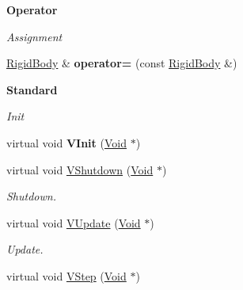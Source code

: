\begin{Indent}{\bf Operator}\par
{\em \label{_amgrpe1b3ec89ead7f83a9245ed5c9cacfdbf}
 Assignment }\begin{DoxyCompactItemize}
\item 
\hypertarget{classContent_1_1Actor_1_1Admin_1_1RigidBody_a066c97c9f287de6a6ba405e5fed4a6dc}{
\hyperlink{classContent_1_1Actor_1_1Admin_1_1RigidBody}{RigidBody} \& {\bfseries operator=} (const \hyperlink{classContent_1_1Actor_1_1Admin_1_1RigidBody}{RigidBody} \&)}
\label{classContent_1_1Actor_1_1Admin_1_1RigidBody_a066c97c9f287de6a6ba405e5fed4a6dc}

\end{DoxyCompactItemize}
\end{Indent}
\begin{Indent}{\bf Standard}\par
{\em \label{_amgrpeb6d8ae6f20283755b339c0dc273988b}
 Init }\begin{DoxyCompactItemize}
\item 
\hypertarget{classContent_1_1Actor_1_1Admin_1_1RigidBody_ad7e5b25f73dded762f6507afb8193a7b}{
virtual void {\bfseries VInit} (\hyperlink{structVoid}{Void} $\ast$)}
\label{classContent_1_1Actor_1_1Admin_1_1RigidBody_ad7e5b25f73dded762f6507afb8193a7b}

\item 
\hypertarget{classContent_1_1Actor_1_1Admin_1_1RigidBody_a7dd39ded6fd6e66612d58546ed5f3be2}{
virtual void \hyperlink{classContent_1_1Actor_1_1Admin_1_1RigidBody_a7dd39ded6fd6e66612d58546ed5f3be2}{VShutdown} (\hyperlink{structVoid}{Void} $\ast$)}
\label{classContent_1_1Actor_1_1Admin_1_1RigidBody_a7dd39ded6fd6e66612d58546ed5f3be2}

\begin{DoxyCompactList}\small\item\em Shutdown. \item\end{DoxyCompactList}\item 
\hypertarget{classContent_1_1Actor_1_1Admin_1_1RigidBody_a0c5d33006ccf7bf38939f79f13a5ef56}{
virtual void \hyperlink{classContent_1_1Actor_1_1Admin_1_1RigidBody_a0c5d33006ccf7bf38939f79f13a5ef56}{VUpdate} (\hyperlink{structVoid}{Void} $\ast$)}
\label{classContent_1_1Actor_1_1Admin_1_1RigidBody_a0c5d33006ccf7bf38939f79f13a5ef56}

\begin{DoxyCompactList}\small\item\em Update. \item\end{DoxyCompactList}\item 
\hypertarget{classContent_1_1Actor_1_1Admin_1_1RigidBody_a437d177f94891c787ae974487faca843}{
virtual void \hyperlink{classContent_1_1Actor_1_1Admin_1_1RigidBody_a437d177f94891c787ae974487faca843}{VStep} (\hyperlink{structVoid}{Void} $\ast$)}
\label{classContent_1_1Actor_1_1Admin_1_1RigidBody_a437d177f94891c787ae974487faca843}


\end{DoxyCompactItemize}
\end{Indent}
